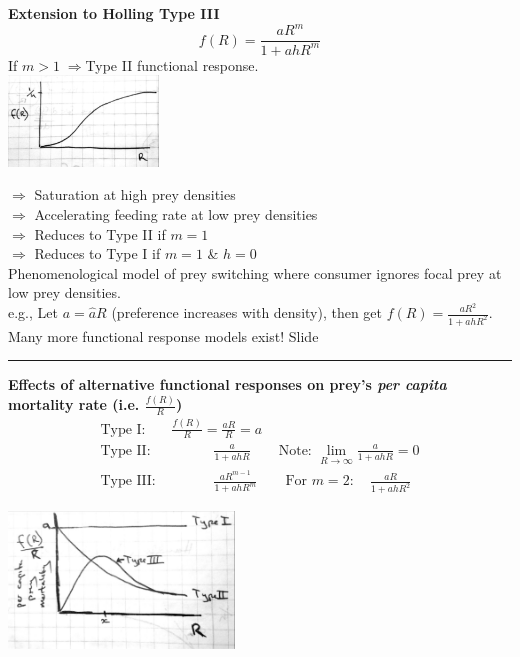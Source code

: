 \documentclass{article}
\newcommand{\note}[1]{\colorbox{gray!30}{#1}}
\newcommand{\ind}{\-\hspace{1cm}}
\begin{document}
\textbf{Extension to Holling Type III}
\begin{equation*}
	f(R)=\frac{aR^m}{1+ahR^m}
\end{equation*}
\ind If $m>1\; \Rightarrow $Type II functional response.\\
\includegraphics[width=4cm]{figs/FR_T3.pdf}

\ind $\Rightarrow$ Saturation at high prey densities\\
\ind $\Rightarrow$ Accelerating feeding rate at low prey densities\\
\ind $\Rightarrow$ Reduces to Type II if $m=1$\\
\ind $\Rightarrow$ Reduces to Type I if $m=1$ \& $h=0$\\

Phenomenological model of prey switching where consumer ignores focal prey at low prey densities.\\
\ind e.g., Let $a = \hat{a}R$ (preference increases with density), then get $f(R)=\frac{aR^2}{1+ahR^2}$.\\

Many more functional response models exist! \note{Slide}

\rule[0.5ex]{\linewidth}{1pt}
\pagebreak

\textbf{Effects of alternative functional responses on prey's \emph{per capita} mortality rate (i.e. $\frac{f(R)}{R}$)}
\begin{align*}
	\text{Type I: } &\frac{f(R)}{R}=\frac{aR}{R}=a \\
	\text{Type II: } & \quad \qquad \frac{a}{1+ahR} \quad \quad \text{Note: }\lim_{R \to \infty}\frac{a}{1+ahR}=0\\
	\text{Type III: } &  \qquad \quad \frac{aR^{m-1}}{1+ahR^m} \quad \quad \text{For }m=2: \quad \frac{aR}{1+ahR^2}
\end{align*}
\begin{center}
\includegraphics[width=6cm]{figs/PreyMort.pdf}
\end{center}
\end{document}
